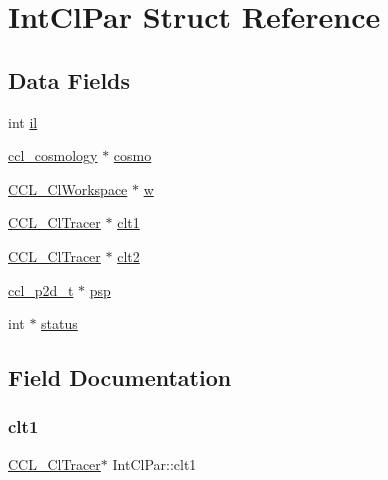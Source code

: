 \hypertarget{struct_int_cl_par}{}\section{Int\+Cl\+Par Struct Reference}
\label{struct_int_cl_par}
\subsection*{Data Fields}
\begin{DoxyCompactItemize}
\item 
int \mbox{\hyperlink{struct_int_cl_par_aedeff726ecb71019ecc8b5784d825060}{il}}
\item 
\mbox{\hyperlink{structccl__cosmology}{ccl\+\_\+cosmology}} $\ast$ \mbox{\hyperlink{struct_int_cl_par_a23ea5c0ad9cf5813be51906bfe326c7d}{cosmo}}
\item 
\mbox{\hyperlink{struct_c_c_l___cl_workspace}{C\+C\+L\+\_\+\+Cl\+Workspace}} $\ast$ \mbox{\hyperlink{struct_int_cl_par_a1b7adafbc56d9fdb5edbe80c950062b6}{w}}
\item 
\mbox{\hyperlink{struct_c_c_l___cl_tracer}{C\+C\+L\+\_\+\+Cl\+Tracer}} $\ast$ \mbox{\hyperlink{struct_int_cl_par_a6a1d336b42313fbd80f79b3e465f3d7f}{clt1}}
\item 
\mbox{\hyperlink{struct_c_c_l___cl_tracer}{C\+C\+L\+\_\+\+Cl\+Tracer}} $\ast$ \mbox{\hyperlink{struct_int_cl_par_a730347547f437f2de5e1dac6791f0b02}{clt2}}
\item 
\mbox{\hyperlink{structccl__p2d__t}{ccl\+\_\+p2d\+\_\+t}} $\ast$ \mbox{\hyperlink{struct_int_cl_par_a6fd01be704421f0c26ad9030cf798f1a}{psp}}
\item 
int $\ast$ \mbox{\hyperlink{struct_int_cl_par_abc2ccba43ee24664930d4471badeba83}{status}}
\end{DoxyCompactItemize}


\subsection{Field Documentation}
\mbox{\label{struct_int_cl_par_a6a1d336b42313fbd80f79b3e465f3d7f}} 
\subsubsection{\texorpdfstring{clt1}{clt1}}
{\footnotesize\ttfamily \mbox{\hyperlink{struct_c_c_l___cl_tracer}{C\+C\+L\+\_\+\+Cl\+Tracer}}$\ast$ Int\+Cl\+Par\+::clt1}

